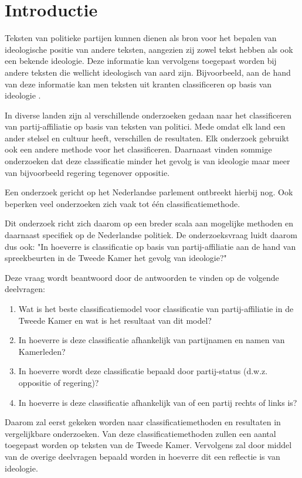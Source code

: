 \section{Introductie}
\label{sec:intro}
Teksten van politieke partijen kunnen dienen als bron voor het bepalen van ideologische positie van andere teksten, aangezien zij zowel tekst hebben als ook een bekende ideologie. Deze informatie kan vervolgens toegepast worden bij andere teksten die wellicht ideologisch van aard zijn. Bijvoorbeeld, aan de hand van deze informatie kan men teksten uit kranten classificeren op basis van ideologie \cite{DBLP:journals/corr/Biessmann16,Hirst_textto}.\par
In diverse landen zijn al verschillende onderzoeken gedaan naar het classificeren van partij-affiliatie op basis van teksten van politici\cite{Ferreira2016UsingTT,DBLP:journals/corr/Biessmann16}. Mede omdat elk land een ander stelsel en cultuur heeft, verschillen de resultaten. Elk onderzoek gebruikt ook een andere methode voor het classificeren. Daarnaast vinden sommige onderzoeken dat deze classificatie minder het gevolg is van ideologie maar meer van bijvoorbeeld regering tegenover oppositie.\cite{Hirst_textto}\par
Een onderzoek gericht op het Nederlandse parlement ontbreekt hierbij nog. Ook beperken veel onderzoeken zich vaak tot één classificatiemethode.\par
Dit onderzoek richt zich daarom op een breder scala aan mogelijke methoden en daarnaast specifiek op de Nederlandse politiek. De onderzoeksvraag luidt daarom dus ook: "In hoeverre is classificatie op basis van partij-affiliatie aan de hand van spreekbeurten in de Tweede Kamer het gevolg van ideologie?"\par
Deze vraag wordt beantwoord door de antwoorden te vinden op de volgende deelvragen:
\begin{enumerate}
    \item Wat is het beste classificatiemodel voor classificatie van partij-affiliatie in de Tweede Kamer en wat is het resultaat van dit model?
    \item In hoeverre is deze classificatie afhankelijk van partijnamen en namen van Kamerleden?
    \item In hoeverre wordt deze classificatie bepaald door partij-status (d.w.z. oppositie of regering)?
    \item In hoeverre is deze classificatie afhankelijk van of een partij rechts of links is?
\end{enumerate}
Daarom zal eerst gekeken worden naar classificatiemethoden en resultaten in vergelijkbare onderzoeken. Van deze classificatiemethoden zullen een aantal toegepast worden op teksten van de Tweede Kamer. Vervolgens zal door middel van de overige deelvragen bepaald worden in hoeverre dit een reflectie is van ideologie.


